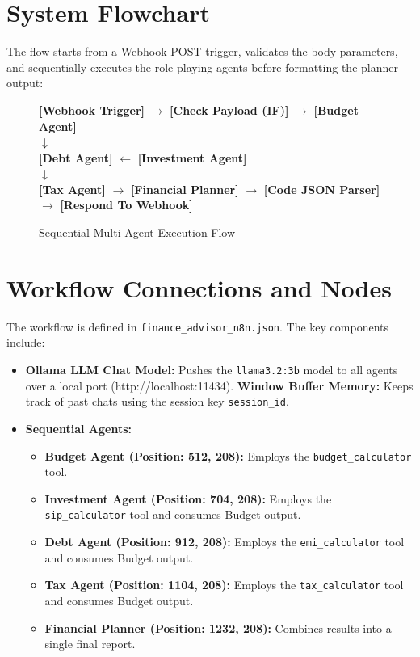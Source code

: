 \documentclass[12pt,a4paper]{report}
\begin{document}
\section{System Flowchart}
The flow starts from a Webhook POST trigger, validates the body parameters, and sequentially executes the role-playing agents before formatting the planner output:
\begin{figure}[H]
    \centering
    \begin{minipage}{1.0\textwidth}
        \centering
        \textbf{[Webhook Trigger]} $\rightarrow$ \textbf{[Check Payload (IF)]} $\rightarrow$ \textbf{[Budget Agent]} \\
        \hspace{8cm} $\downarrow$ \\
        \textbf{[Debt Agent]} $\leftarrow$ \textbf{[Investment Agent]} \\
        \hspace{1cm} $\downarrow$ \\
        \textbf{[Tax Agent]} $\rightarrow$ \textbf{[Financial Planner]} $\rightarrow$ \textbf{[Code JSON Parser]} $\rightarrow$ \textbf{[Respond To Webhook]}
    \end{minipage}
    \caption{Sequential Multi-Agent Execution Flow}
\end{figure}

\section{Workflow Connections and Nodes}
The workflow is defined in \texttt{finance\_advisor\_n8n.json}. The key components include:
\begin{itemize}
    \item \textbf{Ollama LLM Chat Model:} Pushes the \texttt{llama3.2:3b} model to all agents over a local port (http://localhost:11434).
    \textbf{Window Buffer Memory:} Keeps track of past chats using the session key \texttt{session\_id}.
    \item \textbf{Sequential Agents:}
        \begin{itemize}
            \item \textbf{Budget Agent (Position: 512, 208):} Employs the \texttt{budget\_calculator} tool.
            \item \textbf{Investment Agent (Position: 704, 208):} Employs the \texttt{sip\_calculator} tool and consumes Budget output.
            \item \textbf{Debt Agent (Position: 912, 208):} Employs the \texttt{emi\_calculator} tool and consumes Budget output.
            \item \textbf{Tax Agent (Position: 1104, 208):} Employs the \texttt{tax\_calculator} tool and consumes Budget output.
            \item \textbf{Financial Planner (Position: 1232, 208):} Combines results into a single final report.
        \end{itemize}
\end{itemize}
\end{document}
